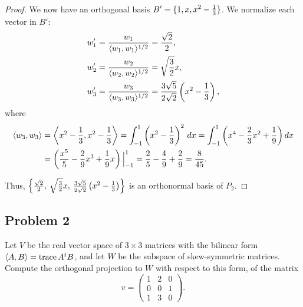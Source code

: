 \documentclass{article}
\theoremstyle{definition}
\newcommand{\trace}{\operatorname{trace}}
\DeclarePairedDelimiter\set{\{}{\}}
\DeclarePairedDelimiter\bilform{\langle}{\rangle}
\newcommand{\evalat}[2]{\Big|_{#1}^{#2}}
\begin{document}
\begin{proof}
We now have an orthogonal basis $B' = \set{1,x,x^2 - \frac{1}{3}}$.
We normalize each vector in $B'$:
\begin{align*}
    w'_1 & = \frac{w_1}{\bilform{w_1, w_1}^{1/2}} = \frac{\sqrt{2}}{2}, \\
    w'_2 & = \frac{w_2}{\bilform{w_2, w_2}^{1/2}} = \sqrt{\frac{3}{2}} x, \\
    w'_3 & = \frac{w_3}{\bilform{w_3, w_3}^{1/2}} = \frac{3\sqrt{5}}{2\sqrt{2}} \left( x^2 - \frac{1}{3} \right),
\end{align*}
where
\begin{align*}
    \bilform{w_3, w_3} 
        & = \bilform*{x^2-\frac{1}{3}, x^2-\frac{1}{3}}
        = \int^1_{-1} \left( x^2-\frac{1}{3} \right)^2 \, dx 
        = \int^1_{-1} \left( x^4 - \frac{2}{3} x^2 + \frac{1}{9} \right) dx \\
    & = \left( \frac{x^5}{5} - \frac{2}{9}x^3 + \frac{1}{9}x \right) \evalat{-1}{1}
    = \frac{2}{5} - \frac{4}{9} + \frac{2}{9} = \frac{8}{45}.
\end{align*}

Thus, $\set*{
    \frac{\sqrt{2}}{2}, \>
    \sqrt{\frac{3}{2}} x, \>
    \frac{3\sqrt{5}}{2\sqrt{2}} \left( x^2 - \frac{1}{3} \right)
}$ is an orthonormal basis of $P_2$.

\end{proof}


\subsection*{Problem 2}

\begin{tcolorbox}
Let $V$ be the real vector space of $3 \times 3$ matrices with the bilinear form $\bilform{A,B} = \trace A^t B$,
and let $W$ be the subspace of skew-symmetric matrices.
Compute the orthogonal projection to $W$ with respect to this form, of the matrix
\[
    v = 
    \begin{pmatrix}
        1 & 2 & 0 \\
        0 & 0 & 1 \\
        1 & 3 & 0
    \end{pmatrix}.
\]
\end{tcolorbox}
\end{document}
